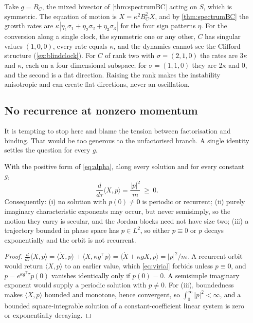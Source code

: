 \begin{example}
\label{ex:convshift}
Take $g=B_C$, the mixed bivector of \cref{thm:spectrumBC} acting on $S$, which is symmetric. The equation of motion is $\ddot X=\kappa^2B_C^2X$, and
by \cref{thm:spectrumBC} the growth rates are $\kappa|\eta_1\sigma_1+\eta_2\sigma_2+\eta_3\sigma_3|$ for the four sign patterns $\eta$. For the
conversion along a single clock, the symmetric one or any other, $C$ has singular values $(1,0,0)$, every rate equals $\kappa$, and the dynamics cannot see the Clifford structure
(\cref{ex:blindclock}). For $C$ of rank two with $\sigma=(2,1,0)$ the rates are $3\kappa$ and $\kappa$, each on a four-dimensional subspace; for
$\sigma=(1,1,0)$ they are $2\kappa$ and $0$, and the second is a flat direction. Raising the rank makes the instability anisotropic and can
create flat directions, never an oscillation.
\end{example}

\subsection{No recurrence at nonzero momentum}

It is tempting to stop here and blame the tension between factorisation and binding. That would be too generous to the unfactorised
branch. A single identity settles the question for every $g$.

\begin{theorem}
\label{thm:virial}
With the positive form of \eqref{eq:alpha}, along every solution and for every constant $g$,
\begin{equation}
\label{eq:virial}
\frac{d}{d\tau}\langle X,p\rangle=\frac{|p|^2}{m}\ \ge\ 0 .
\end{equation}
Consequently: (i) no solution with $p(0)\neq0$ is periodic or recurrent; (ii) purely imaginary characteristic exponents may occur, but never
semisimply, so the motion they carry is secular, and the Jordan blocks need not have size two; (iii) a trajectory bounded in phase space has
$p\in L^2$, so either $p\equiv0$ or $p$ decays exponentially and the orbit is not recurrent.
\end{theorem}

\begin{proof}
$\tfrac{d}{d\tau}\langle X,p\rangle=\langle\dot X,p\rangle+\langle X,\kappa g^{\!\top}p\rangle=\langle\dot X+\kappa gX,p\rangle=|p|^2/m$. A recurrent orbit would
return $\langle X,p\rangle$ to an earlier value, which \eqref{eq:virial} forbids unless $p\equiv0$, and $p=e^{\kappa g^{\!\top}\tau}p(0)$ vanishes
identically only if $p(0)=0$. A semisimple imaginary exponent would supply a periodic solution with $p\neq0$. For (iii), boundedness makes
$\langle X,p\rangle$ bounded and monotone, hence convergent, so $\int_0^\infty|p|^2<\infty$, and a bounded square-integrable solution of a
constant-coefficient linear system is zero or exponentially decaying.
\end{proof}

